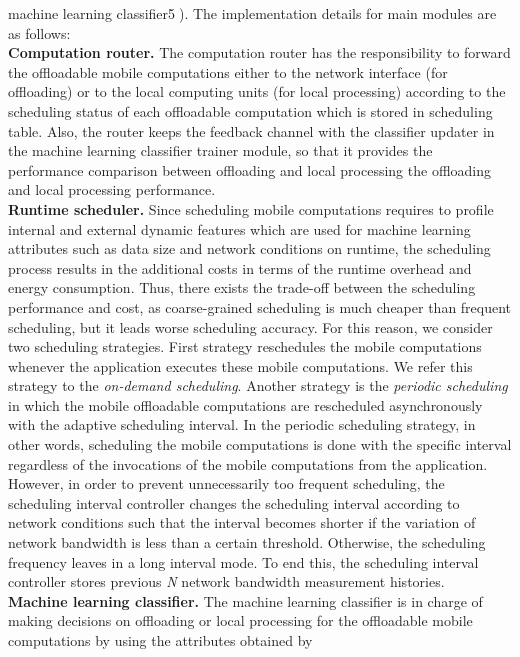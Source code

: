 \documentclass[10pt, conference, compsocconf]{IEEEtran}
\begin{document}
machine learning classifier{\textcircled{5}).
%
The implementation details for main modules are as follows: \\
%
\textbf{Computation router.} The computation router has the
responsibility to forward the offloadable mobile computations either to the
network interface (for offloading) or to the local computing units (for
local processing) according to the scheduling status of each offloadable
computation which is stored in scheduling table.
%
Also, the router keeps the feedback channel with the classifier updater
in the machine learning classifier trainer module, so that it provides
the performance comparison between offloading and local processing 
the offloading and local processing performance.\\
%
\textbf{Runtime scheduler.} Since scheduling mobile computations
requires to profile internal and external dynamic features which are
used for machine learning attributes such as data size and network
conditions on runtime, the scheduling process results in the additional
costs in terms of the runtime overhead and energy consumption.
%
Thus, there exists the trade-off between the scheduling performance and
cost, as coarse-grained scheduling is much cheaper than frequent
scheduling, but it leads worse scheduling accuracy.    
%
For this reason, we consider two scheduling strategies.
%
First strategy reschedules the mobile computations whenever the
application executes these mobile computations.
%
We refer this strategy to the \textit{on-demand scheduling}.
%
Another strategy is the \textit{periodic scheduling} in which the mobile
offloadable computations are rescheduled asynchronously with the adaptive
scheduling interval.
%
In the periodic scheduling strategy, in other words, scheduling the mobile
computations is done with the specific interval regardless of the
invocations of the mobile computations from the application.
%
However, in order to prevent unnecessarily too frequent scheduling, the
scheduling interval controller changes the scheduling interval according
to network conditions such that the interval becomes shorter if the
variation of network bandwidth is less than a certain threshold.
%
Otherwise, the scheduling frequency leaves in a long interval mode.
%
To end this, the scheduling interval controller stores previous
\textit{N} network bandwidth measurement histories.\\
%
\textbf{Machine learning classifier.} The machine learning classifier is
in charge of making decisions on offloading or local processing for the
offloadable mobile computations by using the attributes obtained by
}
\end{document}
